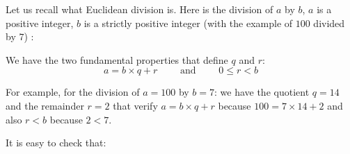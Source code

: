 \documentclass[11pt,class=report,crop=false]{standalone}
\begin{document}





\begin{cours}[Arithmetic]

\index{\ci{//}}
\index{\ci{\%}}

Let us recall what Euclidean division is. Here is the division of $a$ by $b$, $a$ is a positive integer, $b$ is a strictly positive integer (with the example of $100$ divided by $7$) :


We have the two fundamental properties that define $q$ and $r$:
$$a = b \times q  + r \qquad \text{ and } \qquad 0 \le r < b$$

For example, for the division of $a=100$ by $b=7$: we have the quotient $q=14$ and the remainder $r=2$ that verify $a = b \times q  + r$ because $100 = 7 \times 14 + 2$ and also $r<b$ because $2<7$.


It is easy to check that:

\end{cours}


\end{document}
